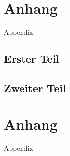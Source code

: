 \appendix
\chapter{Anhang}
Appendix
\section{Erster Teil}
\section{Zweiter Teil}
\chapter{Anhang}
Appendix
